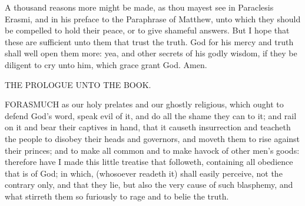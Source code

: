 A thousand reasons more might be made, as 
thou mayest see in Paraclesis Erasmi, and in his 
preface to the Paraphrase of Matthew, unto 
which they should be compelled to hold their 
peace, or to give shameful answers. But I hope 
that these are sufficient unto them that trust the 
truth. God for his mercy and truth shall well open 
them more: yea, and other secrets of his godly 
wisdom, if they be diligent to cry unto him, 
which grace grant God. Amen. 


THE PROLOGUE 
UNTO THE BOOK. 

FORASMUCH as our holy prelates and our ghostly religious,
which ought to defend God's word, speak evil 
of it, and do all the shame they can to it; and rail on it and 
bear their captives in hand, that it causeth insurrection and 
teacheth the people to disobey their heads and governors, 
and moveth them to rise against their princes; and to make 
all common and to make havock of other men's goods:
therefore have I made this little treatise that followeth, containing
all obedience that is of God; in which, (whosoever 
readeth it) shall easily perceive, not the contrary only, and 
that they lie, but also the very cause of such blasphemy, 
and what stirreth them so furiously to rage and to belie the 
truth. 

